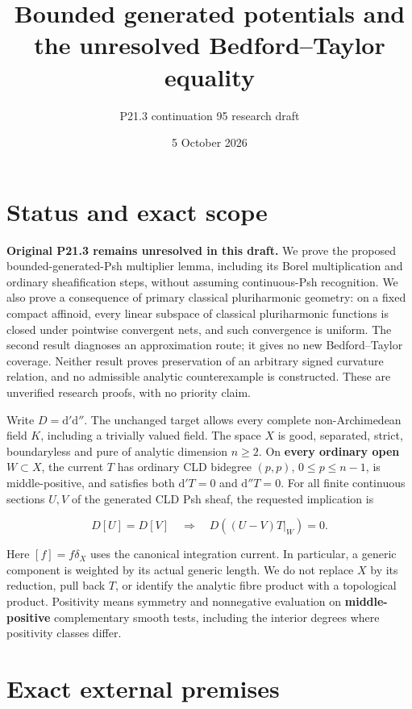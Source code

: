 \documentclass[
  11pt,
]{article}
\title{Bounded generated potentials and the unresolved Bedford--Taylor
equality}
\author{P21.3 continuation 95 research draft}
\date{5 October 2026}
\begin{document}
\maketitle

\section{Status and exact scope}\label{status-and-exact-scope}

\textbf{Original P21.3 remains unresolved in this draft.} We prove the
proposed bounded-generated-Psh multiplier lemma, including its Borel
multiplication and ordinary sheafification steps, without assuming
continuous-Psh recognition. We also prove a consequence of primary
classical pluriharmonic geometry: on a fixed compact affinoid, every
linear subspace of classical pluriharmonic functions is closed under
pointwise convergent nets, and such convergence is uniform. The second
result diagnoses an approximation route; it gives no new Bedford--Taylor
coverage. Neither result proves preservation of an arbitrary signed
curvature relation, and no admissible analytic counterexample is
constructed. These are unverified research proofs, with no priority
claim.

Write \(D=\mathrm d'\mathrm d''\). The unchanged target allows every
complete non-Archimedean field \(K\), including a trivially valued
field. The space \(X\) is good, separated, strict, boundaryless and pure
of analytic dimension \(n\geq2\). On \textbf{every ordinary open}
\(W\subset X\), the current \(T\) has ordinary CLD bidegree \((p,p)\),
\(0\leq p\leq n-1\), is middle-positive, and satisfies both
\(\mathrm d'T=0\) and \(\mathrm d''T=0\). For all finite continuous
sections \(U,V\) of the generated CLD Psh sheaf, the requested
implication is

\[D[U]=D[V]\quad\Longrightarrow\quad D((U-V)T|_W)=0. \tag{1}\]

Here \([f]=f\delta_X\) uses the canonical integration current. In
particular, a generic component is weighted by its actual generic
length. We do not replace \(X\) by its reduction, pull back \(T\), or
identify the analytic fibre product with a topological product.
Positivity means symmetry and nonnegative evaluation on
\textbf{middle-positive} complementary smooth tests, including the
interior degrees where positivity classes differ.

\section{Exact external premises}\label{exact-external-premises}
\end{document}
